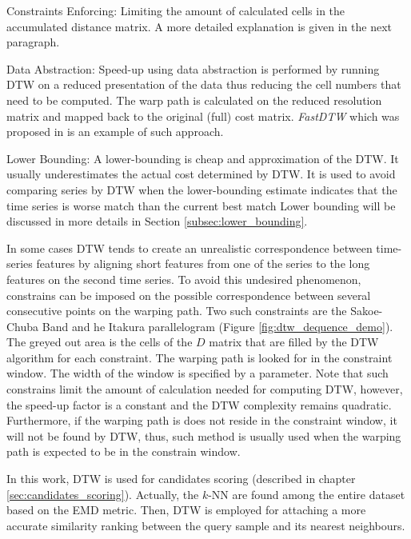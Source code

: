 \begin{compactitem}
\item Constraints Enforcing: Limiting the amount of calculated cells in the accumulated distance matrix. 
A more detailed explanation is given in the next paragraph.
\item Data Abstraction: Speed-up using data abstraction is performed by running DTW on a reduced presentation of the data thus reducing the cell numbers that need to be computed. 
The warp path is calculated on the reduced resolution matrix and mapped back to the original (full) cost matrix. 
\emph{FastDTW} which was proposed in \cite{salvador2007toward} is an example of such approach.
\item Lower Bounding: A lower-bounding is cheap and approximation of the DTW.
It usually underestimates the actual cost determined by DTW. 
It is used to avoid comparing series by DTW when the lower-bounding estimate indicates that the time series is worse match than the current best match \cite{rath2003word} 
Lower bounding will be discussed in more details in Section \ref{subsec:lower_bounding}.
\end{compactitem}

In some cases DTW tends to create an unrealistic correspondence between time-series features by aligning short features from one of the series to the long features on the second time series. 
To avoid this undesired phenomenon, constrains can be imposed on the possible correspondence between several consecutive points on the warping path. 
Two such constraints are the Sakoe-Chuba Band \cite{sakoe1978dynamic} and he Itakura parallelogram \cite{itakura1975minimum} (Figure \ref{fig:dtw_dequence_demo}). 
The greyed out area is the cells of the $D$ matrix that are filled by the DTW algorithm for each constraint. 
The warping path is looked for in the constraint window. 
The width of the window is specified by a parameter. 
Note that such constrains limit the amount of calculation needed for computing DTW, however, the speed-up factor is a constant and the DTW complexity remains quadratic. 
Furthermore, if the warping path is does not reside in the constraint window, it will not be found by DTW, thus, such method is usually used when the warping path is expected to be in the constrain window.

\iftoggle{edit-mode}{\hspace{0pt}\marginpar{How DTW is used in this work?}}{}
In this work, DTW is used for candidates scoring (described in chapter \ref{sec:candidates_scoring}). 
Actually, the $k$-NN are found among the entire dataset based on the EMD metric. 
Then, DTW is employed for attaching a more accurate similarity ranking between the query sample and its nearest neighbours.

